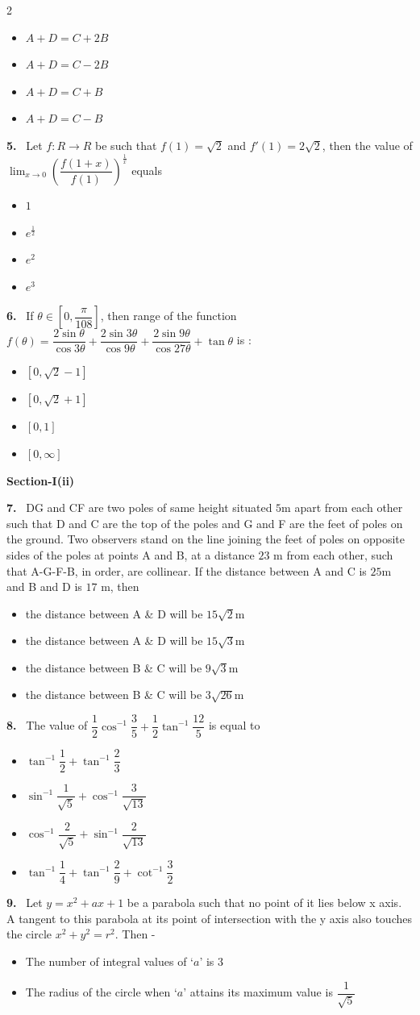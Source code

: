 \documentclass[10pt]{extarticle}
\newcommand{\sect}[1]{\par\smallskip\noindent\textbf{#1}\par}
\newcommand{\qn}[1]{\par\smallskip\noindent\textbf{#1.}~}
\newenvironment{qoptions}{\begin{itemize}[leftmargin=1.8em,itemsep=1pt,topsep=2pt,label={}]}{\end{itemize}}
\newcommand{\opt}[2]{\item[(#1)] #2}
\begin{document}
\begin{multicols}{2}
\begin{qoptions}
\opt{A}{$A+D=C+2B$}
\opt{B}{$A+D=C-2B$}
\opt{C}{$A+D=C+B$}
\opt{D}{$A+D=C-B$}
\end{qoptions}
\qn{5} Let $f:R\to R$ be such that $f(1)=\sqrt2$ and $f'(1)=2\sqrt2$, then the value of $\displaystyle\lim_{x\to0}\left(\dfrac{f(1+x)}{f(1)}\right)^{\frac1x}$ equals
\begin{qoptions}
\opt{A}{$1$}
\opt{B}{$e^{\frac12}$}
\opt{C}{$e^2$}
\opt{D}{$e^3$}
\end{qoptions}
\qn{6} If $\theta\in\left[0,\dfrac\pi{108}\right]$, then range of the function $f(\theta)=\dfrac{2\sin\theta}{\cos3\theta}+\dfrac{2\sin3\theta}{\cos9\theta}+\dfrac{2\sin9\theta}{\cos27\theta}+\tan\theta$ is :
\begin{qoptions}
\opt{A}{$\left[0,\sqrt2-1\right]$}
\opt{B}{$\left[0,\sqrt2+1\right]$}
\opt{C}{$[0,1]$}
\opt{D}{$[0,\infty]$}
\end{qoptions}
\sect{Section-I(ii)}
\qn{7} DG and CF are two poles of same height situated $5$m apart from each other such that D and C are the top of the poles and G and F are the feet of poles on the ground. Two observers stand on the line joining the feet of poles on opposite sides of the poles at points A and B, at a distance $23$ m from each other, such that A-G-F-B, in order, are collinear. If the distance between A and C is $25$m and B and D is $17$ m, then
\begin{qoptions}
\opt{A}{the distance between A \& D will be $15\sqrt2$m}
\opt{B}{the distance between A \& D will be $15\sqrt3$m}
\opt{C}{the distance between B \& C will be $9\sqrt3$m}
\opt{D}{the distance between B \& C will be $3\sqrt{26}$m}
\end{qoptions}
\qn{8} The value of $\dfrac12\cos^{-1}\dfrac35+\dfrac12\tan^{-1}\dfrac{12}5$ is equal to
\begin{qoptions}
\opt{A}{$\tan^{-1}\dfrac12+\tan^{-1}\dfrac23$}
\opt{B}{$\sin^{-1}\dfrac1{\sqrt5}+\cos^{-1}\dfrac3{\sqrt{13}}$}
\opt{C}{$\cos^{-1}\dfrac2{\sqrt5}+\sin^{-1}\dfrac2{\sqrt{13}}$}
\opt{D}{$\tan^{-1}\dfrac14+\tan^{-1}\dfrac29+\cot^{-1}\dfrac32$}
\end{qoptions}
\qn{9} Let $y=x^2+ax+1$ be a parabola such that no point of it lies below x axis. A tangent to this parabola at its point of intersection with the y axis also touches the circle $x^2+y^2=r^2$. Then -
\begin{qoptions}
\opt{A}{The number of integral values of `$a$' is $3$}
\opt{B}{The radius of the circle when `$a$' attains its maximum value is $\dfrac1{\sqrt5}$}

\end{qoptions}
\end{multicols}
\end{document}
